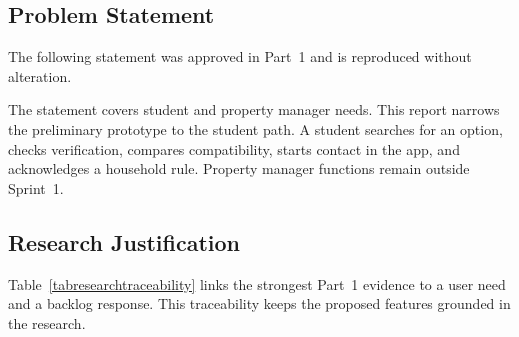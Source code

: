 \documentclass[11pt,a4paper]{article}
\begin{document}
\subsection{Problem Statement}

The following statement was approved in Part~1 and is reproduced without alteration.

\begin{center}
\end{center}

The statement covers student and property manager needs. This report narrows the preliminary prototype to the student path. A student searches for an option, checks verification, compares compatibility, starts contact in the app, and acknowledges a household rule. Property manager functions remain outside Sprint~1.

\subsection{Research Justification}

Table~\ref{tabresearchtraceability} links the strongest Part~1 evidence to a user need and a backlog response. This traceability keeps the proposed features grounded in the research.
\end{document}
